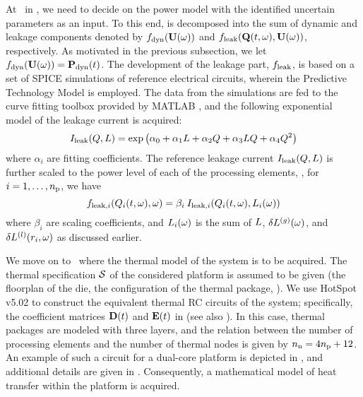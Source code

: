 At \ in , we need to decide on the power model with the identified uncertain parameters as an input.
To this end,  is decomposed into the sum of dynamic and leakage components denoted by $f_{\text{dyn}}(\mathbf{U}(\omega))$ and $f_{\text{leak}}(\mathbf{Q}(t, \omega), \mathbf{U}(\omega))$, respectively.
As motivated in the previous subsection, we let $f_{\text{dyn}}(\mathbf{U}(\omega)) = \mathbf{P}_{\text{dyn}}(t)$.
The development of the leakage part, $f_{\text{leak}}$, is based on a set of SPICE simulations of reference electrical circuits, wherein the Predictive Technology Model \cite{ptm} is employed. The data from the simulations are fed to the curve fitting toolbox provided by MATLAB \cite{matlab}, and the following exponential model of the leakage current is acquired:
\begin{equation} \elabel{leakage-current}
  I_\leak(\T, \Leff) = \exp \left( \alpha_0 + \alpha_1 \Leff + \alpha_2 \T + \alpha_3 \Leff \T + \alpha_4 \T^2 \right)
\end{equation}
where $\alpha_i$ are fitting coefficients. The reference leakage current $I_{\text{leak}}(Q, L)$ is further scaled to the power level of each of the processing elements, \ie, for $i = 1, \dotsc, {n_\text{p}}$, we have
\[
  f_{\text{leak}, i}(Q_i(t, \omega), \omega) = \beta_i \: I_{\text{leak}, i}(Q_i(t, \omega), L_i(\omega))
\]
where $\beta_i$ are scaling coefficients, and $L_i(\omega)$ is the sum of $L$, ${\delta L^{(g)}}(\omega)$, and $\delta L^{(l)}(r_i, \omega)$ as discussed earlier.

We move on to \ where the thermal model of the system is to be acquired. The thermal specification $\mathcal{S}$ of the considered platform is assumed to be given (the floorplan of the die, the configuration of the thermal package, \etc).
We use HotSpot v5.02 \cite{hotspot} to construct the equivalent thermal RC circuits of the system; specifically, the coefficient matrices $\mCF(\t)$ and $\mCS(\t)$ in  (see also ).
In this case, thermal packages are modeled with three layers, and the relation between the number of processing elements and the number of thermal nodes is given by ${n_\text{n}} = 4 {n_\text{p}} + 12$.
An example of such a circuit for a dual-core platform is depicted in , and additional details are given in .
Consequently, a mathematical model of heat transfer within the platform is acquired.
